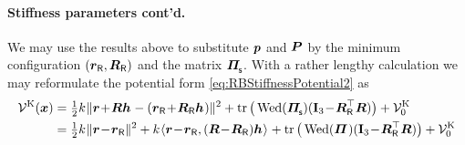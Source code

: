 \paragraph{Stiffness parameters cont'd.}
We may use the results above to substitute $\boldsymbol{p}$ and $\boldsymbol{P}$ by the minimum configuration $(\boldsymbol{r}_{\mathsf{R}}, \boldsymbol{R}_{\mathsf{R}})$ and the matrix $\bodyMOSs{}{}$.
With a rather lengthy calculation we may reformulate the potential form \eqref{eq:RBStiffnessPotential2} as
\begin{subequations}\label{eq:RBStiffnessPotential3}
\begin{align}
 \potentialStiff(\sysCoord) &= \tfrac{1}{2} \bodyStiffness{}{}\norm{\r\!+\!\R\bodyCOS{}{} - (\rR \!+\! \RR\bodyCOS{}{})}^2
  + \tr\big(\wedMatOp(\bodyMOSs{}{})(\idMat[3]\!-\!\RR^\top \R)\big)
   + \potentialStiff_0
\\
 &= \tfrac{1}{2} \bodyStiffness{}{} \norm{\r\!-\!\rR}^2 
 + \bodyStiffness{}{} \sProd{\r\!-\!\rR}{(\R\!-\!\RR)\bodyCOS{}{}}
 + \tr\big(\wedMatOp(\bodyMOS{}{}) (\idMat[3]\!-\!\RR^\top \R)\big)
 + \potentialStiff_0
\end{align}
\end{subequations}

